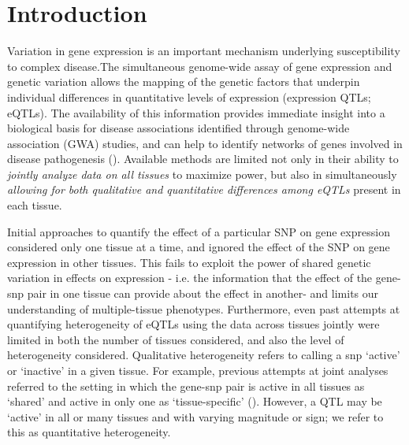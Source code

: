 \section*{Introduction}
Variation in gene expression is an important mechanism underlying susceptibility to complex disease.The simultaneous genome-wide assay of gene expression and genetic variation allows the mapping of the genetic factors that underpin individual differences in quantitative levels of expression (expression QTLs; eQTLs). 
The availability of this information provides immediate insight into a biological basis for disease associations identified through genome-wide association (GWA) studies, and can help to identify networks of genes 
involved in disease pathogenesis (\cite{nicolae_trait-associated_2010, veyrieras_high-resolution_2008}).
Available methods are limited not only in their ability to {\it jointly analyze data on all tissues} to maximize power, but also in simultaneously {\it allowing for both qualitative and quantitative differences among eQTLs} present in each tissue.

Initial approaches to quantify the effect of a particular SNP on gene expression considered only one tissue at a time, and ignored the effect of the SNP on gene expression in other tissues.
This fails to exploit the power of  shared genetic variation in effects on expression - i.e. the information that the effect of the gene-snp pair in one tissue can provide about the effect in another- and limits our understanding of multiple-tissue phenotypes.
Furthermore, even past attempts at quantifying heterogeneity of eQTLs using the data across tissues jointly were limited in both the number of tissues considered, and also the level of heterogeneity considered. Qualitative heterogeneity refers to calling a snp `active' or `inactive' in a given tissue. For example, previous attempts at joint analyses referred to the setting in which the gene-snp pair is active in all tissues as `shared' and active in only one as `tissue-specific'  (\cite{flutre_statistical_2013,wen_bayesian_2014}).
However, a QTL may be `active' in all or many tissues and with varying magnitude or sign; we refer to this as quantitative heterogeneity.

